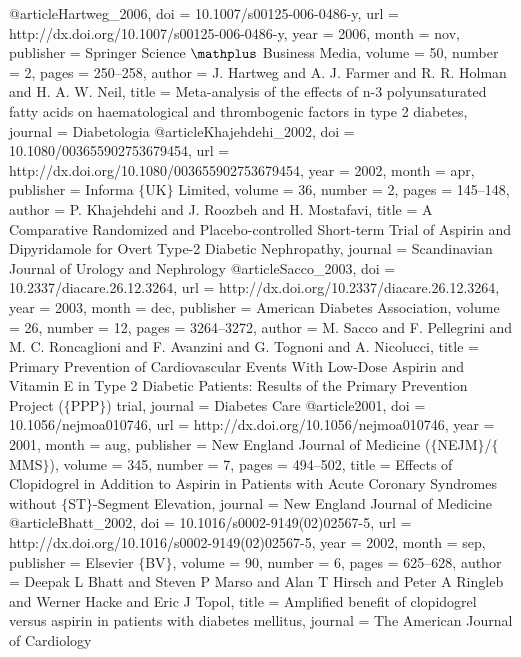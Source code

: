@article{Hartweg_2006,
	doi = {10.1007/s00125-006-0486-y},
	url = {http://dx.doi.org/10.1007/s00125-006-0486-y},
	year = 2006,
	month = {nov},
	publisher = {Springer Science $\mathplus$ Business Media},
	volume = {50},
	number = {2},
	pages = {250--258},
	author = {J. Hartweg and A. J. Farmer and R. R. Holman and H. A. W. Neil},
	title = {Meta-analysis of the effects of n-3 polyunsaturated fatty acids on haematological and thrombogenic factors in type 2 diabetes},
	journal = {Diabetologia}
}
@article{Khajehdehi_2002,
	doi = {10.1080/003655902753679454},
	url = {http://dx.doi.org/10.1080/003655902753679454},
	year = 2002,
	month = {apr},
	publisher = {Informa $\lbrace$UK$\rbrace$ Limited},
	volume = {36},
	number = {2},
	pages = {145--148},
	author = {P. Khajehdehi and J. Roozbeh and H. Mostafavi},
	title = {A Comparative Randomized and Placebo-controlled Short-term Trial of Aspirin and Dipyridamole for Overt Type-2 Diabetic Nephropathy},
	journal = {Scandinavian Journal of Urology and Nephrology}
}
@article{Sacco_2003,
	doi = {10.2337/diacare.26.12.3264},
	url = {http://dx.doi.org/10.2337/diacare.26.12.3264},
	year = 2003,
	month = {dec},
	publisher = {American Diabetes Association},
	volume = {26},
	number = {12},
	pages = {3264--3272},
	author = {M. Sacco and F. Pellegrini and M. C. Roncaglioni and F. Avanzini and G. Tognoni and A. Nicolucci},
	title = {Primary Prevention of Cardiovascular Events With Low-Dose Aspirin and Vitamin E in Type 2 Diabetic Patients: Results of the Primary Prevention Project ($\lbrace$PPP$\rbrace$) trial},
	journal = {Diabetes Care}
}
@article{2001,
	doi = {10.1056/nejmoa010746},
	url = {http://dx.doi.org/10.1056/nejmoa010746},
	year = 2001,
	month = {aug},
	publisher = {New England Journal of Medicine ($\lbrace$NEJM$\rbrace$/$\lbrace$MMS$\rbrace$)},
	volume = {345},
	number = {7},
	pages = {494--502},
	title = {Effects of Clopidogrel in Addition to Aspirin in Patients with Acute Coronary Syndromes without $\lbrace$ST$\rbrace$-Segment Elevation},
	journal = {New England Journal of Medicine}
}
@article{Bhatt_2002,
	doi = {10.1016/s0002-9149(02)02567-5},
	url = {http://dx.doi.org/10.1016/s0002-9149(02)02567-5},
	year = 2002,
	month = {sep},
	publisher = {Elsevier $\lbrace$BV$\rbrace$},
	volume = {90},
	number = {6},
	pages = {625--628},
	author = {Deepak L Bhatt and Steven P Marso and Alan T Hirsch and Peter A Ringleb and Werner Hacke and Eric J Topol},
	title = {Amplified benefit of clopidogrel versus aspirin in patients with diabetes mellitus},
	journal = {The American Journal of Cardiology}
}
